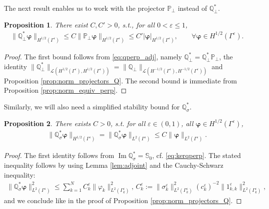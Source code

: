 \documentclass[]{article}
\newtheorem{proposition}{Proposition}
\numberwithin{equation}{section}
\numberwithin{theorem}{section}
\numberwithin{lemma}{section}
\numberwithin{corollary}{section}
\numberwithin{proposition}{section}
\numberwithin{definition}{section}
\newcommand{\re}{\varepsilon}
\renewcommand{\vec}{\boldsymbol}
\renewcommand{\Im}{\operatorname{Im}}
\begin{document}
	The next result enables us to work with the projector $\mathbb{P}_{\perp}$ instead of $\mathbb{Q}_{\perp}^*$. 
	\begin{proposition}
		\label{prop:norm_dual_Q_perp}
		There exist $C,C'>0$, s.t., for all $0<\re\leq 1$, 
		\begin{align*}%
			\|\mathbb{Q}_{\perp}^*\vec{\varphi}\|_{H^{1/2}(\Gamma^{\re})}\leq C 	\|\mathbb{P}_{\perp}\vec{\varphi}\|_{H^{1/2}(\Gamma^{\re})}\leq C' |\vec{\varphi}|_{H^{1/2}(\Gamma^{\re})}, \qquad \forall \vec{\varphi}\in H^{1/2}(\Gamma^{\re}).
		\end{align*}
	\end{proposition}
	\begin{proof}
		The first bound follows from \eqref{eq:qperp_adj}, namely  $\mathbb{Q}_{\perp}^*=\mathbb{Q}_{\perp}^*\mathbb{P}_{\perp}$, the identity $\|\mathbb{Q}_{\perp}^*\|_{\mathcal{L}(H^{1/2}(\Gamma^{\re}),H^{1/2}(\Gamma^{\re}))}=\|\mathbb{Q}_{\perp}\|_{\mathcal{L}(H^{-1/2}(\Gamma^{\re}),H^{-1/2}(\Gamma^{\re}))}$ and Proposition \ref{prop:norm_projectors_Q}. The second bound is immediate from Proposition \ref{prop:norm_equiv_perp}.
	\end{proof}
	Similarly, we will also need a simplified stability bound for $\mathbb{Q}_{\sigma}^*$. 
	\begin{proposition}
		\label{prop:qsigmaP0}
		There exists $C>0$, s.t. for all $\re \in (0,1)$, all $\vec{\varphi}\in H^{1/2}(\Gamma^{\re})$, 
		\begin{align*}%
			\|\mathbb{Q}_{\sigma}^*\vec{\varphi}\|_{H^{1/2}(\Gamma^{\re})} = \|\mathbb{Q}_{\sigma}^*\vec{\varphi}\|_{L^2(\Gamma^{\re})} \leq  C \|\vec{\varphi}\|_{L^2(\Gamma^{\re})}.
		\end{align*}
	\end{proposition}
	\begin{proof}
		The first identity follows from $\Im \mathbb{Q}_{\sigma}^*=\mathbb{S}_0$, cf. \eqref{eq:kerqperp}. The stated inequality follows by using Lemma \ref{lem:adjoint} and the Cauchy-Schwarz inequality:
		\begin{align*}%
			\|\mathbb{Q}_{\sigma}^*\vec{\varphi}\|_{L^2(\Gamma^{\re})}^2\leq \sum\limits_{k=1}^N C_k^{\re}\|{\varphi}_k\|_{L^2(\Gamma_k^{\re})}^2,\, C_k^{\re}:=\|{\sigma}_k^{\re}\|^2_{L^2(\Gamma_k^{\re})}(c^{\re}_k)^{-2} \|1_{k,k}^{\re}\|_{L^2(\Gamma^{\re}_k)}^2,
		\end{align*}
		and we conclude like in the proof of Proposition \ref{prop:norm_projectors_Q}. 
	\end{proof}
	
\end{document}
